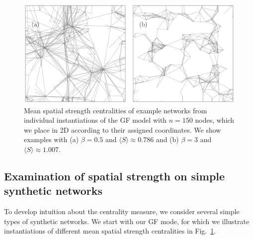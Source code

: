\documentclass[%
 reprint,
 amsmath,amssymb,
 aps,
]{revtex4-1}
\begin{document}
\begin{figure}
    \centering
    \includegraphics[width=1.0\linewidth]{geographic_example_no_highlight2horiz.pdf}
    \caption{Mean spatial strength centralities of example networks from individual instantiations of the GF model with $n=150$ nodes, which we place in 2D according to their assigned coordinates. We show examples with (a) $\beta = 0.5$ and $\langle S \rangle \approx 0.786$ and (b) $\beta = 3$ and $\langle S \rangle \approx 1.007$. 
    }
    \label{fig:network_visualizations}
\end{figure}


\subsection{Examination of spatial strength on simple synthetic networks}

To develop intuition about the centrality measure, we consider several simple types of synthetic networks. We start with our GF mode, for which we illustrate instantiations of different mean spatial strength centralities in Fig.~\ref{fig:network_visualizations}. 
\end{document}
